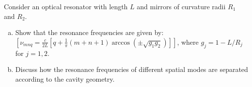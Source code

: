 %

\begin{exercicio}
Consider an optical resonator with length $L$ and mirrors of curvature radii $R_{1}$ and $R_{2}$.

\begin{enumerate}[a)]
\item Show that the resonance frequencies are given by:
$[\nu_{mnq} = \frac{c}{2L} \left[ q + \frac{1}{\pi} (m+n+1) \arccos\left(\pm\sqrt{g_{1}g_{2}}\right) \right]]$,
where $g_{j} = 1 - L/R_{j}$ for $j=1,2$.
\item Discuss how the resonance frequencies of different spatial modes are separated according to the cavity geometry.
\end{enumerate}
\end{exercicio}

